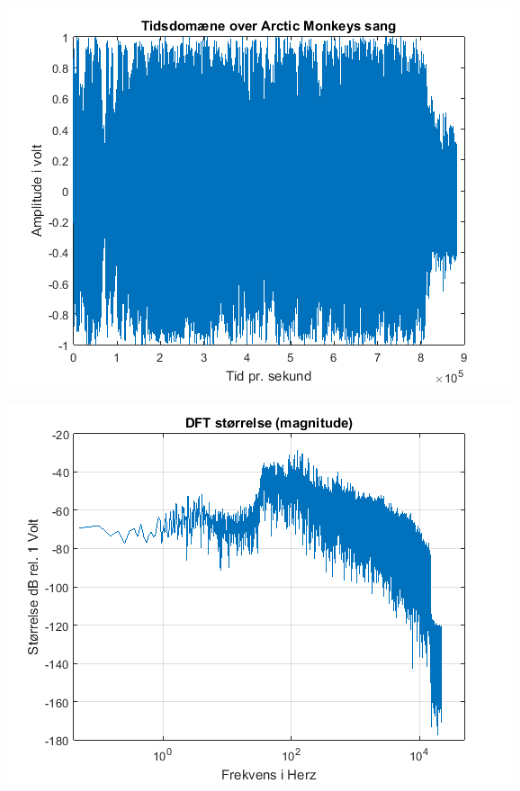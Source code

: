 \documentclass[12pt, letterpaper]{article}
\begin{document}
\begin{center}
\includegraphics[width=\textwidth]{billeder/arctictid}
\end{center}

\begin{center}
\includegraphics[width=\textwidth]{billeder/arcticstorrelse}
\end{center}
\end{document}
